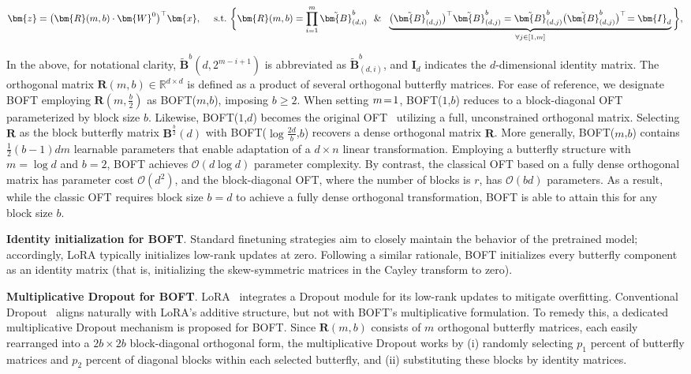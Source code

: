\begin{equation}
    \begin{aligned}\nonumber
    \bm{z}=\big(\bm{R}(m,b)\cdot\bm{W}^0\big)^\top\bm{x},~~~~\text{s.t.}~\bigg{\{}\bm{R}(m,b)=\prod_{i=1}^m \tilde{\bm{B}}^b_{(d,i)}~~\&~~\underbrace{\big(\tilde{\bm{B}}^b_{(d,j)}\big)^\top\tilde{\bm{B}}^b_{(d,j)}=\tilde{\bm{B}}^b_{(d,j)}\big(\tilde{\bm{B}}^b_{(d,j)}\big)^\top\!=\bm{I}_d}_{\forall j\in [1, m]}\bigg{\}},
    \end{aligned}
\end{equation}

In the above, for notational clarity, $\tilde{\bm{B}}^b(d,2^{m - i+1})$ is abbreviated as $\tilde{\bm{B}}^b_{(d,i)}$, and $\bm{I}_d$ indicates the $d$-dimensional identity matrix. The orthogonal matrix $\bm{R}(m,b)\in\mathbb{R}^{d\times d}$ is defined as a product of several orthogonal butterfly matrices. For ease of reference, we designate BOFT employing $\bm{R}(m,\frac{b}{2})$ as BOFT($m$,$b$), imposing $b\geq 2$. When setting $\thickmuskip=2mu \medmuskip=2mu m=1$, BOFT($1$,$b$) reduces to a block-diagonal OFT~\cite{qiu2023controlling} parameterized by block size $b$. Likewise, BOFT($1$,$d$) becomes the original OFT~\cite{qiu2023controlling} utilizing a full, unconstrained orthogonal matrix. Selecting $\bm{R}$ as the block butterfly matrix $\bm{B}^{\frac{b}{2}}(d)$ with BOFT($\log \frac{2d}{b}$,$b$) recovers a dense orthogonal matrix $\bm{R}$. More generally, BOFT($m$,$b$) contains $\frac{1}{2}(b-1)dm$ learnable parameters that enable adaptation of a $d\times n$ linear transformation. Employing a butterfly structure with $m=\log d$ and $b=2$, BOFT achieves $\mathcal{O}(d\log d)$ parameter complexity. By contrast, the classical OFT based on a fully dense orthogonal matrix has parameter cost $\mathcal{O}(d^2)$, and the block-diagonal OFT, where the number of blocks is $r$, has $\mathcal{O}(bd)$ parameters. As a result, while the classic OFT requires block size $b=d$ to achieve a fully dense orthogonal transformation, BOFT is able to attain this for any block size $b$.

\textbf{Identity initialization for BOFT}. Standard finetuning strategies aim to closely maintain the behavior of the pretrained model; accordingly, LoRA typically initializes low-rank updates at zero. Following a similar rationale, BOFT initializes every butterfly component as an identity matrix (that is, initializing the skew-symmetric matrices in the Cayley transform to zero).

\textbf{Multiplicative Dropout for BOFT}. LoRA~\cite{hulora2022} integrates a Dropout module for its low-rank updates to mitigate overfitting. Conventional Dropout~\cite{srivastava2014dropout} aligns naturally with LoRA’s additive structure, but not with BOFT’s multiplicative formulation. To remedy this, a dedicated multiplicative Dropout mechanism is proposed for BOFT. Since $\bm{R}(m,b)$ consists of $m$ orthogonal butterfly matrices, each easily rearranged into a $2b\times 2b$ block-diagonal orthogonal form, the multiplicative Dropout works by (i) randomly selecting $p_1$ percent of butterfly matrices and $p_2$ percent of diagonal blocks within each selected butterfly, and (ii) substituting these blocks by identity matrices.

